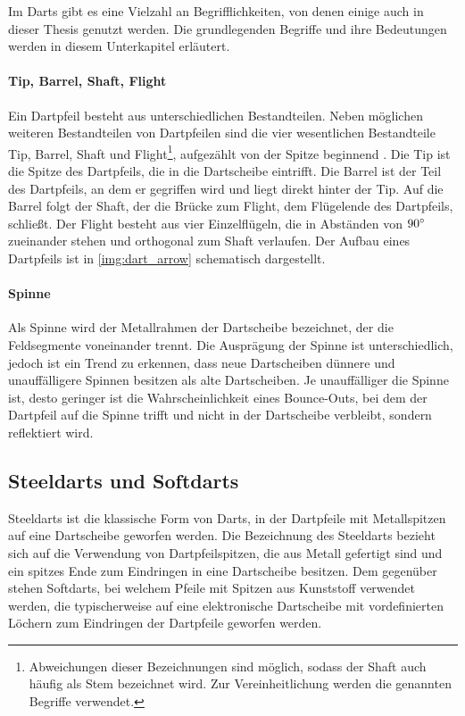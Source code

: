 Im Darts gibt es eine Vielzahl an Begrifflichkeiten, von denen einige auch in dieser Thesis genutzt werden. Die grundlegenden Begriffe und ihre Bedeutungen werden in diesem Unterkapitel erläutert.

\paragraph{Tip, Barrel, Shaft, Flight}

Ein Dartpfeil besteht aus unterschiedlichen Bestandteilen. Neben möglichen weiteren Bestandteilen von Dartpfeilen sind die vier wesentlichen Bestandteile Tip, Barrel, Shaft und Flight\footnote{Abweichungen dieser Bezeichnungen sind möglich, sodass der Shaft auch häufig als Stem bezeichnet wird. Zur Vereinheitlichung werden die genannten Begriffe verwendet.}, aufgezählt von der Spitze beginnend \cite{wdf-rules,pdc_rules}. Die Tip ist die Spitze des Dartpfeils, die in die Dartscheibe eintrifft. Die Barrel ist der Teil des Dartpfeils, an dem er gegriffen wird und liegt direkt hinter der Tip. Auf die Barrel folgt der Shaft, der die Brücke zum Flight, dem Flügelende des Dartpfeils, schließt. Der Flight besteht aus vier Einzelflügeln, die in Abständen von $90^{\circ}$ zueinander stehen und orthogonal zum Shaft verlaufen. Der Aufbau eines Dartpfeils ist in \autoref{img:dart_arrow} schematisch dargestellt.

\paragraph{Spinne}

Als Spinne wird der Metallrahmen der Dartscheibe bezeichnet, der die Feldsegmente voneinander trennt. Die Ausprägung der Spinne ist unterschiedlich, jedoch ist ein Trend zu erkennen, dass neue Dartscheiben dünnere und unauffälligere Spinnen besitzen als alte Dartscheiben. Je unauffälliger die Spinne ist, desto geringer ist die Wahrscheinlichkeit eines Bounce-Outs, bei dem der Dartpfeil auf die Spinne trifft und nicht in der Dartscheibe verbleibt, sondern reflektiert wird.


\subsection{Steeldarts und Softdarts}
\label{sec:steeldarts}

Steeldarts ist die klassische Form von Darts, in der Dartpfeile mit Metallspitzen auf eine Dartscheibe geworfen werden. Die Bezeichnung des Steeldarts bezieht sich auf die Verwendung von Dartpfeilspitzen, die aus Metall gefertigt sind und ein spitzes Ende zum Eindringen in eine Dartscheibe besitzen. Dem gegenüber stehen Softdarts, bei welchem Pfeile mit Spitzen aus Kunststoff verwendet werden, die typischerweise auf eine elektronische Dartscheibe mit vordefinierten Löchern zum Eindringen der Dartpfeile geworfen werden.

